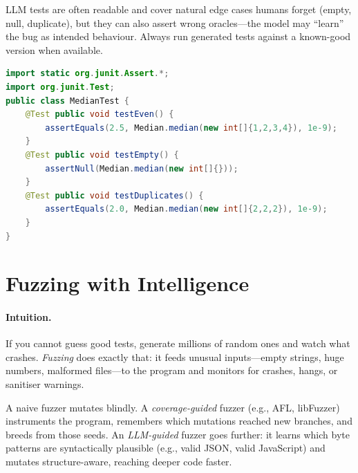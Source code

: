 LLM tests are often readable and cover natural edge cases humans forget (empty, null, duplicate), but they can also assert wrong oracles---the model may ``learn'' the bug as intended behaviour. Always run generated tests against a known-good version when available.

\begin{lstlisting}[language=Java, caption={LLM-generated JUnit test (Java) for the same median logic. The oracle is explicit.}, label={lst:junit-test}]
import static org.junit.Assert.*;
import org.junit.Test;
public class MedianTest {
    @Test public void testEven() {
        assertEquals(2.5, Median.median(new int[]{1,2,3,4}), 1e-9);
    }
    @Test public void testEmpty() {
        assertNull(Median.median(new int[]{}));
    }
    @Test public void testDuplicates() {
        assertEquals(2.0, Median.median(new int[]{2,2,2}), 1e-9);
    }
}
\end{lstlisting}

\section{Fuzzing with Intelligence}
\label{sec:fuzzing}
\paragraph{Intuition.} If you cannot guess good tests, generate millions of random ones and watch what crashes. \emph{Fuzzing} does exactly that: it feeds unusual inputs---empty strings, huge numbers, malformed files---to the program and monitors for crashes, hangs, or sanitiser warnings.

A naive fuzzer mutates blindly. A \emph{coverage-guided} fuzzer (e.g., AFL, libFuzzer) instruments the program, remembers which mutations reached new branches, and breeds from those seeds. An \emph{LLM-guided} fuzzer goes further: it learns which byte patterns are syntactically plausible (e.g., valid JSON, valid JavaScript) and mutates structure-aware, reaching deeper code faster.

